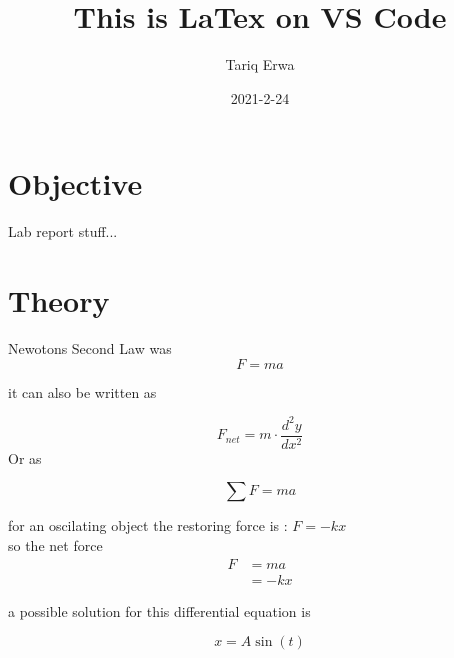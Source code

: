 \documentclass{article}
\title{This is LaTex on VS Code}
\author{Tariq Erwa}
\date{2021-2-24}
\begin{document}

   \maketitle
   \newpage
   \section*{Objective}
       Lab report stuff...
   \section*{Theory}
   Newotons Second Law was
   \begin{equation}\label{a}
      F=ma
   \end{equation}

   it can also be written as

   $$
   F_{net} = m \cdot \frac{d^2 y}{d x^2} 
   $$
   Or as

   \[
   \sum F = ma
   \]

   for an oscilating object the restoring force is : $F = -kx$ \\ 
   so the net force 
   \begin{align*}
      F &= ma\\
      &= -kx 
   \end{align*}
   
   a possible solution for this differential equation is

   $$
   x =A \sin (t)
   $$
\end{document}
